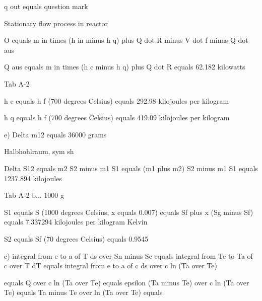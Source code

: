 q out equals question mark

Stationary flow process in reactor

O equals m in times (h in minus h q) plus Q dot R minus V dot f minus Q dot aus

Q aus equals m in times (h c minus h q) plus Q dot R equals 62.182 kilowatts

Tab A-2

h c equals h f (700 degrees Celsius) equals 292.98 kilojoules per kilogram

h q equals h f (700 degrees Celsius) equals 419.09 kilojoules per kilogram

e) Delta m12 equals 36000 grams

Halbhohlraum, sym sh

Delta S12 equals m2 S2 minus m1 S1 equals (m1 plus m2) S2 minus m1 S1 equals 1237.894 kilojoules

Tab A-2 b... 1000 g

S1 equals S (1000 degrees Celsius, x equals 0.007) equals Sf plus x (Sg minus Sf) equals 7.337294 kilojoules per kilogram Kelvin

S2 equals Sf (70 degrees Celsius) equals 0.9545

c) integral from e to a of T ds over Sn minus Sc equals integral from Te to Ta of c over T dT equals integral from e to a of c ds over c ln (Ta over Te)

equals Q over c ln (Ta over Te) equals epsilon (Ta minus Te) over c ln (Ta over Te) equals Ta minus Te over ln (Ta over Te) equals